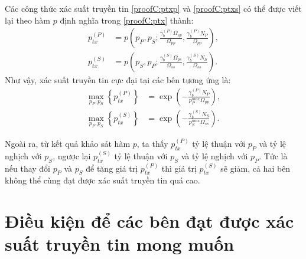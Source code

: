 \documentclass[../main.tex]{subfiles}
\begin{document}
Các công thức xác suất truyền tin \eqref{proofC:ptxp} và \eqref{proofC:ptxs} có thể được viết lại theo hàm $p$ định nghĩa trong \eqref{proofC:ptx} thành:
\begin{subequations}\label{proofC:ptxrw}
\begin{align}
p_{tx}^{(P)} &= p\left(p_P, p_S; \frac{\gamma_b^{(P)}\Omega_{sp}}{\Omega_{pp}}, \frac{\gamma_b^{(P)}N_P}{\Omega_{pp}}\right), \label{proofC:ptxprw} \\
p_{tx}^{(S)} &= p\left(p_S, p_P; \frac{\gamma_b^{(S)}\Omega_{ps}}{\Omega_{ss}}, \frac{\gamma_b^{(S)}N_S}{\Omega_{ss}}\right). \label{proofC:ptxsrw}
\end{align}
\end{subequations}
Như vậy, xác suất truyền tin cực đại tại các bên tương ứng là:
\begin{subequations}\label{proofC:ptxmax}
\begin{align}
\max_{p_P, p_S}\left\{p_{tx}^{(P)}\right\} &= \exp\left(-\frac{\gamma_b^{(P)}N_P}{p_P^{max}\Omega_{pp}}\right), \\
\max_{p_P, p_S}\left\{p_{tx}^{(S)}\right\} &= \exp\left(-\frac{\gamma_b^{(S)}N_S}{p_S^{max}\Omega_{ss}}\right).
\end{align}
\end{subequations}

Ngoài ra, từ kết quả khảo sát hàm $p$, ta thấy $p_{tx}^{(P)}$ tỷ lệ thuận với $p_P$ và tỷ lệ nghịch với $p_S$, ngược lại $p_{tx}^{(S)}$ tỷ lệ thuận với $p_S$ và tỷ lệ nghịch với $p_P$. Tức là nếu thay đổi $p_P$ và $p_S$ để tăng giá trị $p_{tx}^{(P)}$ thì giá trị $p_{tx}^{(S)}$ sẽ giảm, cả hai bên không thể cùng đạt được xác suất truyền tin quá cao.

\section{Điều kiện để các bên đạt được xác suất truyền tin mong muốn}
\end{document}
